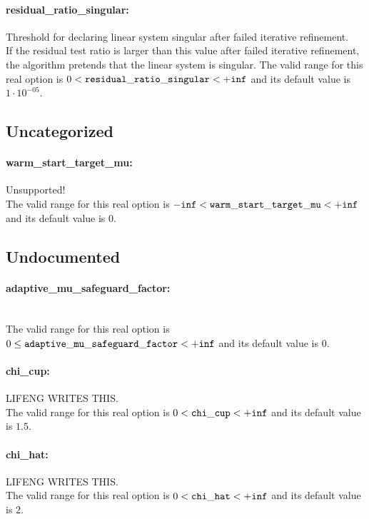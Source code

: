 \paragraph{residual\_ratio\_singular:}\label{opt:residual_ratio_singular} Threshold for declaring linear system singular after failed iterative refinement. \\
 If the residual test ratio is larger than this value after failed iterative refinement, the algorithm pretends that the linear system is singular. The valid range for this real option is 
$0 <  {\tt residual\_ratio\_singular } <  {\tt +inf}$
and its default value is $1 \cdot 10^{-05}$.


\subsection{Uncategorized}
\label{sec:Uncategorized}
\paragraph{warm\_start\_target\_mu:}\label{opt:warm_start_target_mu} Unsupported! \\
 The valid range for this real option is 
${\tt -inf} <  {\tt warm\_start\_target\_mu } <  {\tt +inf}$
and its default value is $0$.


\subsection{Undocumented}
\label{sec:Undocumented}
\paragraph{adaptive\_mu\_safeguard\_factor:}\label{opt:adaptive_mu_safeguard_factor} ~ \\
 The valid range for this real option is 
$0 \le {\tt adaptive\_mu\_safeguard\_factor } <  {\tt +inf}$
and its default value is $0$.


\paragraph{chi\_cup:}\label{opt:chi_cup} LIFENG WRITES THIS. \\
 The valid range for this real option is 
$0 <  {\tt chi\_cup } <  {\tt +inf}$
and its default value is $1.5$.


\paragraph{chi\_hat:}\label{opt:chi_hat} LIFENG WRITES THIS. \\
 The valid range for this real option is 
$0 <  {\tt chi\_hat } <  {\tt +inf}$
and its default value is $2$.


